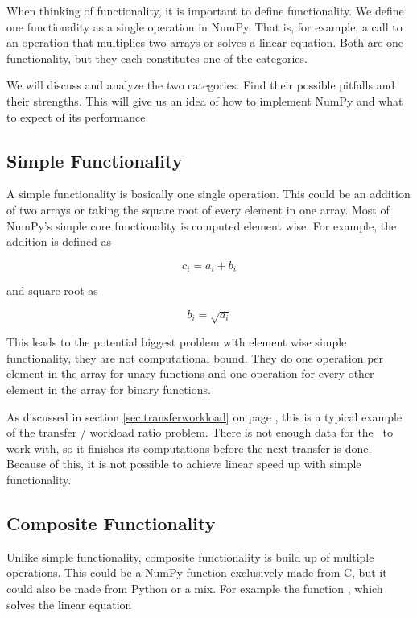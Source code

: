 When thinking of functionality, it is important to define
functionality. We define one functionality as a single operation in
NumPy. That is, for example, a call to an operation that multiplies
two arrays or solves a linear equation. Both are one functionality,
but they each constitutes one of the categories.

We will discuss and analyze the two categories. Find their possible
pitfalls and their strengths. This will give us an idea of how to
implement NumPy and what to expect of its performance.


\subsection{Simple Functionality}
\label{sec:simple_functionality}

A simple functionality is basically one single operation. This could
be an addition of two arrays or taking the square root of every
element in one array. Most of NumPy's simple core functionality is
computed element wise. For example, the addition is defined as

\[
c_i = a_i + b_i
\]

and square root as

\[
b_i = \sqrt{a_i}
\]

This leads to the potential biggest problem with element wise simple
functionality, they are not computational bound. They do one operation
per element in the array for unary functions and one operation for
every other element in the array for binary functions.

As discussed in section \ref{sec:transferworkload} on
page \pageref{sec:transferworkload}, this is a typical example of the
transfer / workload ratio problem. There is not enough data for
the \SPU\ to work with, so it finishes its computations before the
next transfer is done. Because of this, it is not possible to achieve
linear speed up with simple functionality.

\subsection{Composite Functionality}
\label{sec:composite_functionality}

Unlike simple functionality, composite functionality is build up of
multiple operations. This could be a NumPy function exclusively made
from C, but it could also be made from Python or a mix. For example
the function , which solves the linear equation

